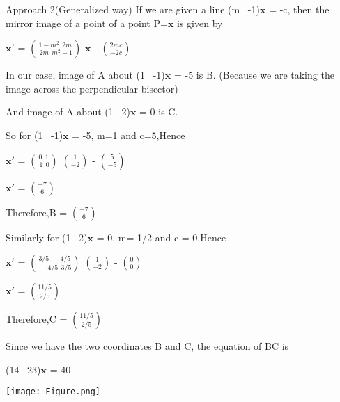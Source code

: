 \documentclass{beamer}
\begin{document}
\begin{frame}{Approach 2(Generalized way)}
\vspace{2 mm}
If we are given a line (m \ -1)$\boldsymbol{x}$ = -c, then the mirror image of a point of a point P=$\boldsymbol{x}$ is given by

\vspace{2 mm}

$\boldsymbol{x'}$  =  $\binom{1 - m^2 \ \ 2m}{\ 2m \ \ m^2 - 1}$ $\boldsymbol{x}$ -   $\binom{2mc}{-2c}$
\vspace{2 mm}

In our case, image of A about  (1 \ -1)$\boldsymbol{x}$ = -5 is B.
\vspace{2 mm}
(Because we are taking the image across the perpendicular bisector)




\vspace{2 mm}
And image of A about  (1 \ 2)$\boldsymbol{x}$ = 0 is C.



\vspace{2 mm}
So for (1 \ -1)$\boldsymbol{x}$ = -5, m=1 and c=5,Hence



\vspace{2 mm}
$\boldsymbol{x'}$  =  $\binom{0 \ \ 1}{\ 1 \ \ 0}$ $\binom{1}{-2}$ -   $\binom{5}{-5}$


\vspace{2 mm}
$\boldsymbol{x'}$ = $\binom{-7}{6}$


\vspace{2 mm}
Therefore,B = $\binom{-7}{6}$
\end{frame}
\begin{frame}
\vspace{2 mm}
Similarly for  (1 \ 2)$\boldsymbol{x}$ = 0, m=-1/2 and c = 0,Hence


\vspace{2 mm}
$\boldsymbol{x'}$  =  $\binom{3/5 \ \ -4/5}{\ -4/5 \ \ 3/5}$ $\binom{1}{-2}$ -   $\binom{0}{0}$


\vspace{2 mm}
$\boldsymbol{x'}$ = $\binom{11/5}{2/5}$

\vspace{2 mm}
Therefore,C = $\binom{11/5}{2/5}$


\vspace{2 mm}
Since we have the two coordinates B and C, 
the equation of BC is 

\setlength{\parindent}{3.6cm}
\vspace{2 mm}
(14  \ 23)$\boldsymbol{x}$ = 40
\end{frame}
\texttt{[image: Figure.png]}
\end{document}

